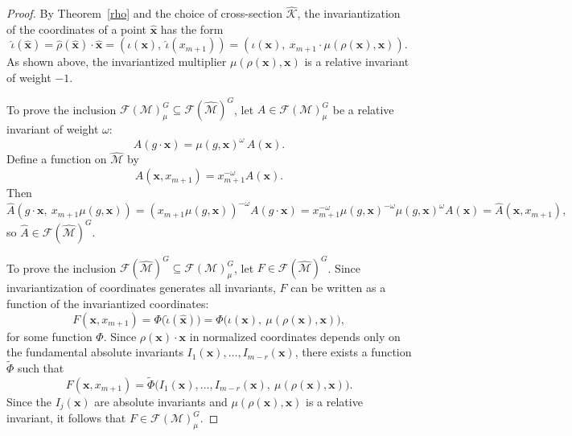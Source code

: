 \documentclass[12pt,reqno]{amsart}
\begin{document}
\begin{proof}

By Theorem~\ref{rho} and the choice of cross-section $\widehat{\mathcal K}$,
the invariantization of the coordinates of a point $\boldsymbol{\hat x}$ has the form
$$
\hat{\iota}(\boldsymbol{\hat x}) = \widehat{\rho}(\boldsymbol{\hat x}) \cdot \boldsymbol{\hat x}
= (\iota(\boldsymbol x),\ \widehat{\iota}(x_{m+1}))
= \left(\iota(\boldsymbol x),\ x_{m+1} \cdot \mu(\rho(\boldsymbol x), \boldsymbol x)\right).
$$
As shown above, the invariantized multiplier $\mu(\rho(\boldsymbol x), \boldsymbol x)$
is a relative invariant of weight $-1$.

\medskip

To prove the inclusion $\mathcal F(\mathcal M)^G_\mu \subseteq \mathcal F(\widehat{\mathcal M})^G$,
let $A \in \mathcal F(\mathcal M)^G_\mu$ be a relative invariant of weight $\omega$:
$$
A(g \cdot \boldsymbol x) = \mu(g, \boldsymbol x)^\omega\, A(\boldsymbol x).
$$
Define a function on $\widehat{\mathcal M}$ by
\[
\widehat{A}(\boldsymbol x, x_{m+1}) = x_{m+1}^{-\omega} A(\boldsymbol x).
\]
Then
\[
\widehat{A}(g \cdot \boldsymbol x,\ x_{m+1} \mu(g, \boldsymbol x))
= (x_{m+1} \mu(g, \boldsymbol x))^{-\omega} A(g \cdot \boldsymbol x)
= x_{m+1}^{-\omega} \mu(g, \boldsymbol x)^{-\omega} \mu(g, \boldsymbol x)^{\omega} A(\boldsymbol x)
= \widehat{A}(\boldsymbol x, x_{m+1}),
\]
so $\widehat{A} \in \mathcal F(\widehat{\mathcal M})^G$.

\medskip

To prove the inclusion $\mathcal F(\widehat{\mathcal M})^G \subseteq \mathcal F(\mathcal M)^G_\mu$,
let $F \in \mathcal F(\widehat{\mathcal M})^G$. Since invariantization of coordinates generates all invariants,
$F$ can be written as a function of the invariantized coordinates:
$$
F(\boldsymbol x, x_{m+1}) = \Phi\bigl(\hat{\iota}(\boldsymbol{\hat x})\bigr)
= \Phi\bigl(\iota(\boldsymbol x),\ \mu(\rho(\boldsymbol x), \boldsymbol x)\bigr),
$$
for some function $\Phi$. Since $\rho(\boldsymbol x) \cdot \boldsymbol x$ in normalized coordinates depends
only on the fundamental absolute invariants $I_1(\boldsymbol x), \dots, I_{m-r}(\boldsymbol x)$,
there exists a function $\widetilde{\Phi}$ such that
$$
F(\boldsymbol x, x_{m+1}) = \widetilde{\Phi}\bigl(I_1(\boldsymbol x),\dots,I_{m-r}(\boldsymbol x),\ \mu(\rho(\boldsymbol x), \boldsymbol x)\bigr).
$$
Since the $I_j(\boldsymbol x)$ are absolute invariants and $\mu(\rho(\boldsymbol x), \boldsymbol x)$ is a relative invariant,
it follows that $F \in \mathcal F(\mathcal M)^G_\mu$.


\end{proof}
\end{document}
